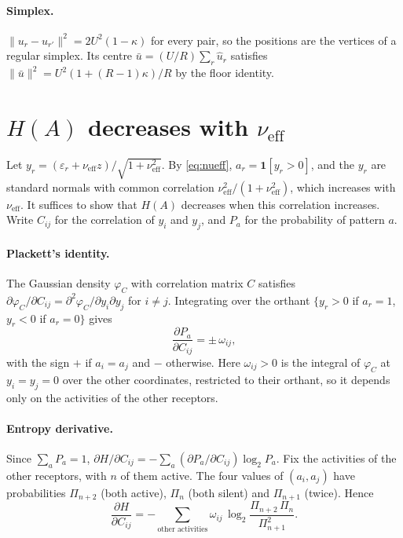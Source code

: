 \documentclass[11pt,a4paper]{article}
\newcommand{\uhat}{\hat{u}}
\newcommand{\nueff}{\nu_{\mathrm{eff}}}
\newcommand{\one}{\mathbf{1}}
\begin{document}
\paragraph{Simplex.} $\|u_r-u_{r'}\|^2=2U^2(1-\kappa)$ for every pair, so the positions are
the vertices of a regular simplex. Its centre $\bar u=(U/R)\sum_r\uhat_r$ satisfies
$\|\bar u\|^2=U^2(1+(R-1)\kappa)/R$ by the floor identity.

\section{\texorpdfstring{$H(A)$}{H(A)} decreases with \texorpdfstring{$\nueff$}{nu\_eff}}
\label{app:mono}

Let $y_r=(\varepsilon_r+\nueff z)/\sqrt{1+\nueff^2}$. By \eqref{eq:nueff},
$a_r=\one[y_r>0]$, and the $y_r$ are standard normals with common correlation
$\nueff^2/(1+\nueff^2)$, which increases with $\nueff$. It suffices to show that $H(A)$
decreases when this correlation increases. Write $C_{ij}$ for the correlation of $y_i$ and
$y_j$, and $P_a$ for the probability of pattern $a$.

\paragraph{Plackett's identity.} The Gaussian density $\varphi_C$ with correlation matrix
$C$ satisfies $\partial\varphi_C/\partial C_{ij}=\partial^2\varphi_C/\partial y_i\partial y_j$
for $i\neq j$. Integrating over the orthant $\{y_r>0$ if $a_r=1$, $y_r<0$ if $a_r=0\}$
gives
\begin{equation*}
  \frac{\partial P_a}{\partial C_{ij}}=\pm\,\omega_{ij},
\end{equation*}
with the sign $+$ if $a_i=a_j$ and $-$ otherwise. Here $\omega_{ij}>0$ is the integral of
$\varphi_C$ at $y_i=y_j=0$ over the other coordinates, restricted to their orthant, so it
depends only on the activities of the other receptors.

\paragraph{Entropy derivative.} Since $\sum_aP_a=1$,
$\partial H/\partial C_{ij}=-\sum_a(\partial P_a/\partial C_{ij})\log_2P_a$. Fix the
activities of the other receptors, with $n$ of them active. The four values of $(a_i,a_j)$
have probabilities $\Pi_{n+2}$ (both active), $\Pi_n$ (both silent) and $\Pi_{n+1}$
(twice). Hence
\begin{equation*}
  \frac{\partial H}{\partial C_{ij}}
  =-\sum_{\text{other activities}}\omega_{ij}\,
  \log_2\frac{\Pi_{n+2}\,\Pi_n}{\Pi_{n+1}^2}.
\end{equation*}
\end{document}
